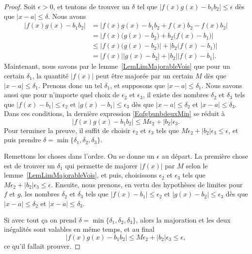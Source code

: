 \begin{proof}
	Soit \( \epsilon>0\), et tentons de trouver un \( \delta\) tel que \( | f(x)g(x)-b_1b_2 |\leq \epsilon\) dès que \( | x-a |\leq \delta\). Nous avons
	\begin{equation}    \label{EqfgbunbdeuxMin}
		\begin{split}
			| f(x)g(x)-b_1b_2 | & =|  f(x)g(x)-b_1b_2 +f(x)b_2-f(x)b_2 |                                                \\
			                    & =\left|   f(x)\big( g(x)-b_2 \big)+b_2\big( f(x)-b_1 \big)    \right|                 \\
			                    & \leq \left|  f(x)\big( g(x)-b_2 \big)  \right|+\left| b_2\big( f(x)-b_1 \big) \right| \\
			                    & = | f(x) | | g(x)-b_2  |+| b_2 | |f(x)-b_1 |.
		\end{split}
	\end{equation}
	Maintenant, nous savons par le lemme~\ref{LemLimMajorableVois} que pour un certain \( \delta_1\), la quantité \( | f(x) |\) peut être majorée par un certain \( M\) dès que \( | x-a |\leq \delta_1\). Prenons donc un tel \( \delta_1\), et supposons que \( | x-a |\leq \delta_1\). Nous savons aussi que pour n'importe quel choix de \( \epsilon_2\) et \( \epsilon_3\), il existe des nombres \( \delta_2\) et \( \delta_3\) tels que \( | f(x)-b_1 |\leq \epsilon_2\) et \( | g(x)-b_1 |\leq \epsilon_3\) dès que \( | x-a |\leq\delta_2\) et \( | x-a |\leq\delta_3\). Dans ces conditions, la dernière expression \eqref{EqfgbunbdeuxMin} se réduit à
	\begin{equation}
		| f(x)g(x)-b_1b_2 |\leq M\epsilon_2+| b_2 |\epsilon_3.
	\end{equation}
	Pour terminer la preuve, il suffit de choisir \( \epsilon_2\) et \( \epsilon_3\) tels que \( M\epsilon_2+| b_2 |\epsilon_3\leq\epsilon\), et puis prendre \( \delta=\min\{ \delta_1,\delta_2,\delta_3 \}\).

	Remettons les choses dans l'ordre. On se donne un \( \epsilon\) au départ. La première chose est de trouver un \( \delta_1\) qui permette de majorer \( |f(x)|\) par \( M\) selon le lemme~\ref{LemLimMajorableVois}, et puis, choisissons \( \epsilon_2\) et \( \epsilon_3\) tels que \( M\epsilon_2+| b_2 |\epsilon_3\leq\epsilon\). Ensuite, nous prenons, en vertu des hypothèses de limites pour \( f\) et \( g\), les nombres \( \delta_2\) et \( \delta_3\) tels que \( | f(x)-b_1 |\leq \epsilon_2\) et \( | g(x)-b_2 |\leq \epsilon_3\) dès que \( | x-a |\leq \delta_2\) et \( | x-a |\leq \delta_3\).

	Si avec tout ça on prend \( \delta=\min\{ \delta_1,\delta_2,\delta_3 \}\), alors la majoration et les deux inégalités sont valables en même temps, et au final
	\[
		| f(x)g(x)-b_1b_2 |\leq M\epsilon_2+|b_2|\epsilon_3 \leq \epsilon,
	\]
	ce qu'il fallait prouver.
\end{proof}

